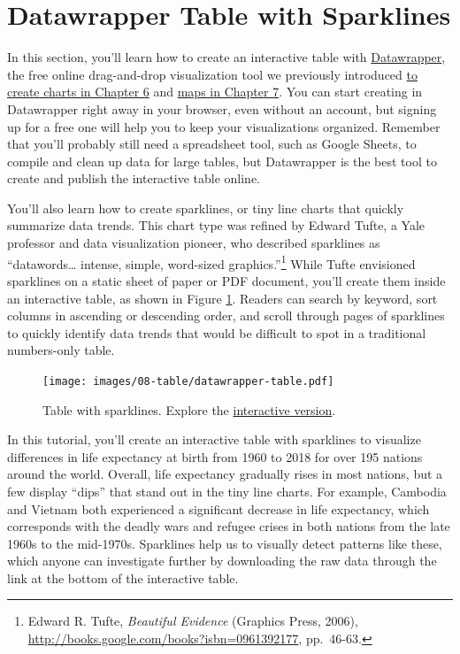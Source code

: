 \documentclass[
  english,
]{book}
\begin{document}
\hypertarget{table-datawrapper}{%
\section*{Datawrapper Table with Sparklines}\label{table-datawrapper}}

In this section, you'll learn how to create an interactive table with \href{https://www.datawrapper.de}{Datawrapper}, the free online drag-and-drop visualization tool we previously introduced \href{chart-design.html}{to create charts in Chapter 6} and \href{map-design.html}{maps in Chapter 7}. You can start creating in Datawrapper right away in your browser, even without an account, but signing up for a free one will help you to keep your visualizations organized. Remember that you'll probably still need a spreadsheet tool, such as Google Sheets, to compile and clean up data for large tables, but Datawrapper is the best tool to create and publish the interactive table online.

You'll also learn how to create sparklines, or tiny line charts that quickly summarize data trends. This chart type was refined by Edward Tufte, a Yale professor and data visualization pioneer, who described sparklines as ``datawords\ldots{} intense, simple, word-sized graphics.''\footnote{Edward R. Tufte, \emph{Beautiful {Evidence}} ({Graphics Press}, 2006), \url{http://books.google.com/books?isbn=0961392177}, pp.~46-63.} While Tufte envisioned sparklines on a static sheet of paper or PDF document, you'll create them inside an interactive table, as shown in Figure \ref{fig:datawrapper-table}. Readers can search by keyword, sort columns in ascending or descending order, and scroll through pages of sparklines to quickly identify data trends that would be difficult to spot in a traditional numbers-only table.



\begin{figure}
\centering
\texttt{[image: images/08-table/datawrapper-table.pdf]}
\caption{\label{fig:datawrapper-table}Table with sparklines. Explore the \href{https://datawrapper.dwcdn.net/0HK4f/}{interactive version}.}
\end{figure}

In this tutorial, you'll create an interactive table with sparklines to visualize differences in life expectancy at birth from 1960 to 2018 for over 195 nations around the world. Overall, life expectancy gradually rises in most nations, but a few display ``dips'' that stand out in the tiny line charts. For example, Cambodia and Vietnam both experienced a significant decrease in life expectancy, which corresponds with the deadly wars and refugee crises in both nations from the late 1960s to the mid-1970s. Sparklines help us to visually detect patterns like these, which anyone can investigate further by downloading the raw data through the link at the bottom of the interactive table.
\end{document}
